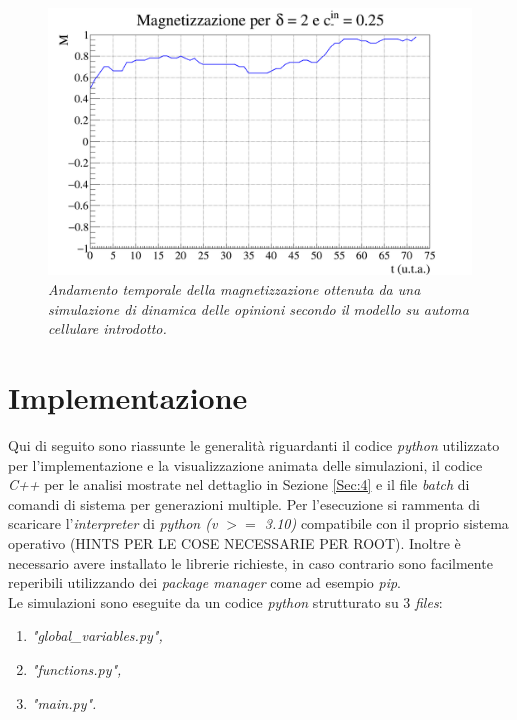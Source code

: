 \documentclass[letterpaper,10pt]{article}
\begin{document}
\begin{figure}[h]
\centering
\includegraphics[width = \linewidth]{poland_sim_magnetization_graph.png}
\caption{\textit{Andamento temporale della magnetizzazione ottenuta da una simulazione di dinamica delle opinioni secondo il modello su automa cellulare introdotto. }}
\label{Fig:21}
\end{figure}

\section{Implementazione}
\label{Sec:5}

Qui di seguito sono riassunte le generalità riguardanti il codice \textit{python} utilizzato per l'implementazione e la visualizzazione animata delle simulazioni, il codice \textit{C++} per le analisi mostrate nel dettaglio in Sezione \ref{Sec:4} e il file \textit{batch} di comandi di sistema per generazioni multiple. Per l'esecuzione si rammenta di scaricare l'\textit{interpreter} di \textit{python (v ${>=}$ 3.10)} compatibile con il proprio sistema operativo (HINTS PER LE COSE NECESSARIE PER ROOT). Inoltre è necessario avere installato le librerie richieste, in caso contrario sono facilmente reperibili utilizzando dei \textit{package manager} come ad esempio \textit{pip}.
\\ Le simulazioni sono eseguite da un codice \textit{python} strutturato su 3 \textit{files}:

\begin{enumerate}
  \item \textit{"global\_variables.py",}
  \item \textit{"functions.py",}
  \item \textit{"main.py".}
\end{enumerate}
\end{document}
